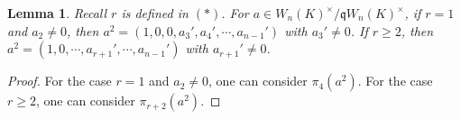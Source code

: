 \documentclass{proc-l}
\newtheorem{lemma}[theorem]{Lemma}
\theoremstyle{definition}
\theoremstyle{remark}
\numberwithin{equation}{section}
\begin{document}
{%
\begin{lemma}{\label{312}}
    Recall $r$ is defined in $(*)$. For $a\in W_n(K)^\times/\mathfrak qW_n(K)^\times$, if $r=1$ and $a_2\neq0$, then $a^2=(1,0,0,a_3',a_4',\cdots,a_{n-1}')$ with $a_3'\neq0$. If $r\geq2$, then $a^2=(1,0,\cdots,a_{r+1}',\cdots,a_{n-1}')$  with $a_{r+1}'\neq0$.  %
\end{lemma}
\begin{proof}
For the case $r=1$ and $a_2\neq0$, one can consider $\pi_4(a^2)$. For the case $r\geq2$, one can consider $\pi_{r+2}(a^2)$.

\end{proof}}
\end{document}
